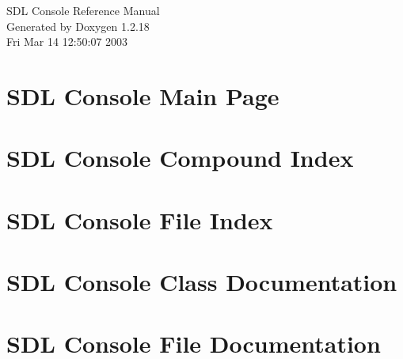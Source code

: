 \documentclass[a4paper]{book}
\begin{document}
\begin{titlepage}
\vspace*{7cm}
\begin{center}
{\Large SDL Console Reference Manual}\\
\vspace*{1cm}
{\large Generated by Doxygen 1.2.18}\\
\vspace*{0.5cm}
{\small Fri Mar 14 12:50:07 2003}\\
\end{center}
\end{titlepage}
\clearemptydoublepage
{}
\tableofcontents
\clearemptydoublepage
{}
\chapter{SDL Console Main Page}
\label{index}
\chapter{SDL Console Compound Index}

\chapter{SDL Console File Index}

\chapter{SDL Console Class Documentation}


\chapter{SDL Console File Documentation}


\printindex
\end{document}
